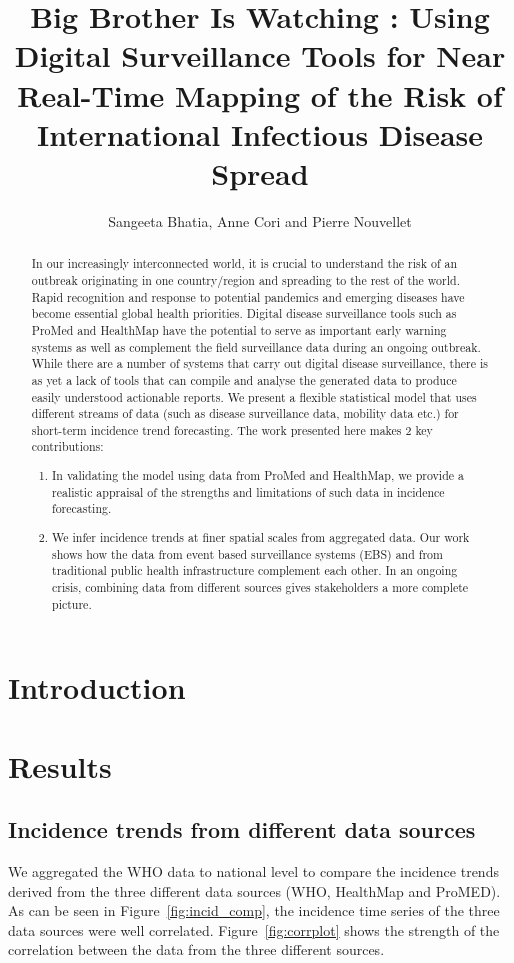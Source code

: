 \documentclass[a4paper,12pt]{article}
\begin{document}
\title{Big Brother Is Watching : Using Digital Surveillance Tools for Near Real-Time Mapping of the Risk of International Infectious Disease Spread}
\author{ Sangeeta Bhatia, Anne Cori and Pierre Nouvellet}
\maketitle

\begin{abstract}
  In our increasingly interconnected world, it is crucial to
  understand the risk of an outbreak originating in one country/region
  and  spreading to the rest of the world. Rapid recognition and
  response to potential pandemics and emerging diseases have become
  essential global health priorities. Digital disease surveillance
  tools such as ProMed and HealthMap have the potential to serve as
  important early warning systems as well as complement the field
  surveillance data during an ongoing outbreak. While there are a
  number of systems that carry out digital disease surveillance, there
  is as yet a lack of tools that can compile and analyse the generated
  data to produce easily understood actionable reports. We present a flexible statistical model that uses different streams
  of data (such as disease surveillance data, mobility data etc.) for
  short-term incidence trend forecasting.
  The work presented here makes 2 key contributions:
  \begin{enumerate}
  \item In validating the model using data from ProMed and HealthMap,
    we provide a realistic appraisal of the strengths and limitations
    of such data in incidence forecasting.
    \item We infer incidence trends at finer spatial scales from
      aggregated data. Our work shows how the data from
      event based surveillance systems (EBS) and from traditional
      public health infrastructure complement each other. In an
      ongoing crisis, combining data from different sources gives
      stakeholders a more complete picture.
  \end{enumerate}
\end{abstract}
\section*{Introduction}
\section*{Results}
\subsection*{Incidence trends from different data sources}
We aggregated the WHO data to national level to compare the incidence
trends derived from the three different data sources (WHO, HealthMap
and ProMED). As can be seen in Figure~\ref{fig:incid_comp}, the incidence time series
of the three data sources were well
correlated. Figure~\ref{fig:corrplot} shows the strength of the
correlation between the data from the three different sources.
\end{document}
